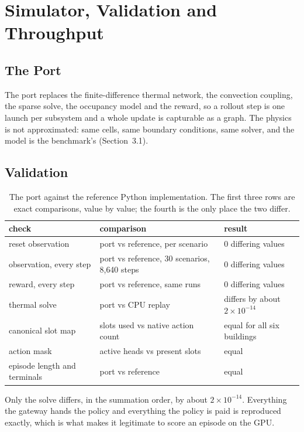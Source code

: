 \documentclass{article}
\begin{document}
\section{Simulator, Validation and Throughput}
\label{app:sim}

\subsection{The Port}
\label{app:port}

The port replaces the finite-difference thermal network, the convection coupling, the sparse solve, the occupancy model and the reward, so a rollout step is one launch per subsystem and a whole update is capturable as a graph. The physics is not approximated: same cells, same boundary conditions, same solver, and the model is the benchmark's (Section~3.1).

\subsection{Validation}
\label{app:validation}

\begin{table}[h!]
\centering
\small
\begin{tabular}{@{}lll@{}}
\toprule
check & comparison & result \\
\midrule
reset observation & port vs reference, per scenario & 0 differing values \\
observation, every step & port vs reference, 30 scenarios, 8{,}640 steps & 0 differing values \\
reward, every step & port vs reference, same runs & 0 differing values \\
thermal solve & port vs CPU replay & differs by about $2\times10^{-14}$ \\
canonical slot map & slots used vs native action count & equal for all six buildings \\
action mask & active heads vs present slots & equal \\
episode length and terminals & port vs reference & equal \\
\bottomrule
\end{tabular}
\vspace{4pt}
\caption{The port against the reference Python implementation. The first three rows are exact comparisons, value by value; the fourth is the only place the two differ.}
\label{tab:app_validation}
\end{table}

Only the solve differs, in the summation order, by about $2\times10^{-14}$. Everything the gateway hands the policy and everything the policy is paid is reproduced exactly, which is what makes it legitimate to score an episode on the GPU.
\end{document}
